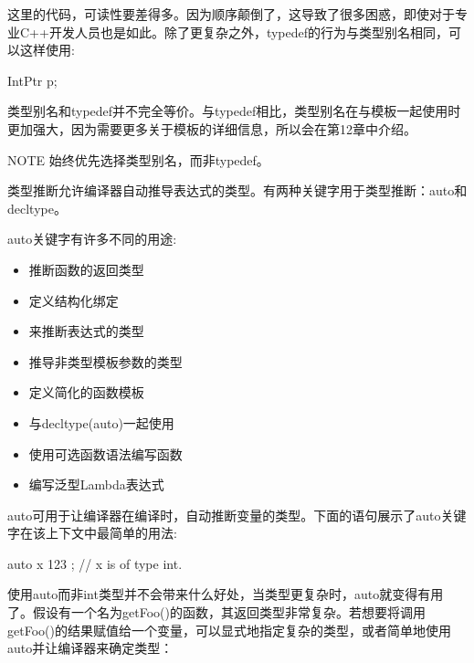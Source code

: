 这里的代码，可读性要差得多。因为顺序颠倒了，这导致了很多困惑，即使对于专业C++开发人员也是如此。除了更复杂之外，typedef的行为与类型别名相同，可以这样使用:

\begin{cpp}
IntPtr p;
\end{cpp}

类型别名和typedef并不完全等价。与typedef相比，类型别名在与模板一起使用时更加强大，因为需要更多关于模板的详细信息，所以会在第12章中介绍。

\begin{myNotic}{NOTE}
始终优先选择类型别名，而非typedef。
\end{myNotic}


类型推断允许编译器自动推导表达式的类型。有两种关键字用于类型推断：auto和decltype。


auto关键字有许多不同的用途:

\begin{itemize}
\item
推断函数的返回类型

\item
定义结构化绑定

\item
来推断表达式的类型

\item
推导非类型模板参数的类型

\item
定义简化的函数模板

\item
与decltype(auto)一起使用

\item
使用可选函数语法编写函数

\item
编写泛型Lambda表达式
\end{itemize}

auto可用于让编译器在编译时，自动推断变量的类型。下面的语句展示了auto关键字在该上下文中最简单的用法:

\begin{cpp}
auto x { 123 }; // x is of type int.
\end{cpp}

使用auto而非int类型并不会带来什么好处，当类型更复杂时，auto就变得有用了。假设有一个名为getFoo()的函数，其返回类型非常复杂。若想要将调用getFoo()的结果赋值给一个变量，可以显式地指定复杂的类型，或者简单地使用auto并让编译器来确定类型：

